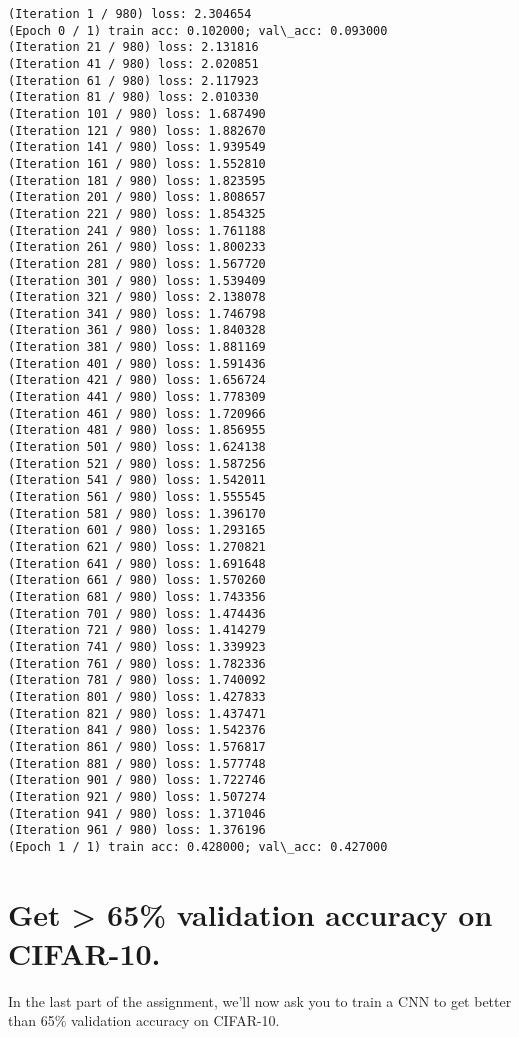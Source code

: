 \documentclass[11pt]{article}
\begin{document}
    \begin{Verbatim}[commandchars=\\\{\}]
(Iteration 1 / 980) loss: 2.304654
(Epoch 0 / 1) train acc: 0.102000; val\_acc: 0.093000
(Iteration 21 / 980) loss: 2.131816
(Iteration 41 / 980) loss: 2.020851
(Iteration 61 / 980) loss: 2.117923
(Iteration 81 / 980) loss: 2.010330
(Iteration 101 / 980) loss: 1.687490
(Iteration 121 / 980) loss: 1.882670
(Iteration 141 / 980) loss: 1.939549
(Iteration 161 / 980) loss: 1.552810
(Iteration 181 / 980) loss: 1.823595
(Iteration 201 / 980) loss: 1.808657
(Iteration 221 / 980) loss: 1.854325
(Iteration 241 / 980) loss: 1.761188
(Iteration 261 / 980) loss: 1.800233
(Iteration 281 / 980) loss: 1.567720
(Iteration 301 / 980) loss: 1.539409
(Iteration 321 / 980) loss: 2.138078
(Iteration 341 / 980) loss: 1.746798
(Iteration 361 / 980) loss: 1.840328
(Iteration 381 / 980) loss: 1.881169
(Iteration 401 / 980) loss: 1.591436
(Iteration 421 / 980) loss: 1.656724
(Iteration 441 / 980) loss: 1.778309
(Iteration 461 / 980) loss: 1.720966
(Iteration 481 / 980) loss: 1.856955
(Iteration 501 / 980) loss: 1.624138
(Iteration 521 / 980) loss: 1.587256
(Iteration 541 / 980) loss: 1.542011
(Iteration 561 / 980) loss: 1.555545
(Iteration 581 / 980) loss: 1.396170
(Iteration 601 / 980) loss: 1.293165
(Iteration 621 / 980) loss: 1.270821
(Iteration 641 / 980) loss: 1.691648
(Iteration 661 / 980) loss: 1.570260
(Iteration 681 / 980) loss: 1.743356
(Iteration 701 / 980) loss: 1.474436
(Iteration 721 / 980) loss: 1.414279
(Iteration 741 / 980) loss: 1.339923
(Iteration 761 / 980) loss: 1.782336
(Iteration 781 / 980) loss: 1.740092
(Iteration 801 / 980) loss: 1.427833
(Iteration 821 / 980) loss: 1.437471
(Iteration 841 / 980) loss: 1.542376
(Iteration 861 / 980) loss: 1.576817
(Iteration 881 / 980) loss: 1.577748
(Iteration 901 / 980) loss: 1.722746
(Iteration 921 / 980) loss: 1.507274
(Iteration 941 / 980) loss: 1.371046
(Iteration 961 / 980) loss: 1.376196
(Epoch 1 / 1) train acc: 0.428000; val\_acc: 0.427000

    \end{Verbatim}

    \hypertarget{get-65-validation-accuracy-on-cifar-10.}{%
\section{Get \textgreater{} 65\% validation accuracy on
CIFAR-10.}\label{get-65-validation-accuracy-on-cifar-10.}}

In the last part of the assignment, we'll now ask you to train a CNN to
get better than 65\% validation accuracy on CIFAR-10.
\end{document}
